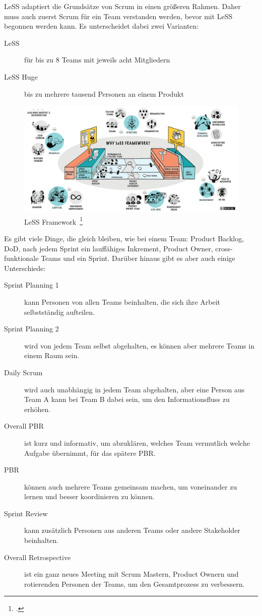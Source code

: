 \ac{LeSS} adaptiert die Grundsätze von Scrum in einen größeren Rahmen.
Daher muss auch zuerst Scrum für ein Team verstanden werden, bevor mit \ac{LeSS} begonnen werden kann.
Es unterscheidet dabei zwei Varianten:
\begin{description}
  \item[LeSS] für bis zu 8 Teams mit jeweils acht Mitgliedern
  \item[LeSS Huge] bis zu mehrere tausend Personen an einem Produkt
\end{description}

\begin{savenotes}
  \begin{figure}[H] 
    \centering
       \includegraphics[width=1.0\textwidth]{img/less.png}
    \caption[\ac{LeSS} Framework]{\ac{LeSS} Framework~\footcite{less_framework}}\label{fig:less}
  \end{figure}
\end{savenotes}

Es gibt viele Dinge, die gleich bleiben, wie bei einem Team: Product Backlog, \ac{DoD}, nach jedem Sprint ein lauffähiges Inkrement, Product Owner, cross-funktionale Teams und ein Sprint.
Darüber hinaus gibt es aber auch einige Unterschiede:

\begin{description}
  \item[Sprint Planning 1] kann Personen von allen Teams beinhalten, die sich ihre Arbeit selbstständig aufteilen.
  \item[Sprint Planning 2] wird von jedem Team selbst abgehalten, es können aber mehrere Teams in einem Raum sein.
  \item[Daily Scrum] wird auch unabhängig in jedem Team abgehalten, aber eine Person aus Team A kann bei Team B dabei sein, um den Informationsfluss zu erhöhen.
  \item[Overall \ac{PBR}] ist kurz und informativ, um abzuklären, welches Team vermutlich welche Aufgabe übernimmt, für das spätere \ac{PBR}.
  \item[\ac{PBR}] können auch mehrere Teams gemeinsam machen, um voneinander zu lernen und besser koordinieren zu können.
  \item[Sprint Review] kann zusätzlich Personen aus anderen Teams oder andere Stakeholder beinhalten.
  \item[Overall Retrospective] ist ein ganz neues Meeting mit Scrum Mastern, Product Ownern und rotierenden Personen der Teams, um den Gesamtprozess zu verbessern.
\end{description}

